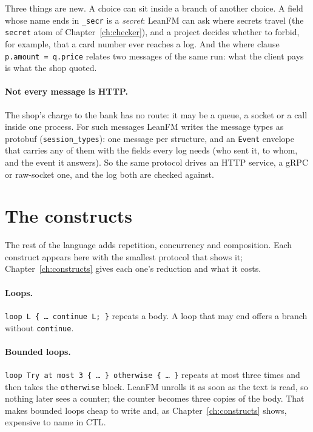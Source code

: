 Three things are new. A choice can sit inside a branch of another choice. A field
whose name ends in \texttt{\_secr} is a \emph{secret}: LeanFM can ask where secrets
travel (the \texttt{secret} atom of Chapter~\ref{ch:checker}), and a project decides
whether to forbid, for example, that a card number ever reaches a log. And the where
clause \texttt{p.amount = q.price} relates two messages of the same run: what the
client pays is what the shop quoted.

\paragraph{Not every message is HTTP.} The shop's charge to the bank has no route:
it may be a queue, a socket or a call inside one process. For such messages LeanFM
writes the message types as protobuf (\texttt{session\_types}): one message per
structure, and an \texttt{Event} envelope that carries any of them with the fields
every log needs (who sent it, to whom, and the event it answers). So the same
protocol drives an HTTP service, a gRPC or raw-socket one, and the log both are
checked against.


\section{The constructs}

The rest of the language adds repetition, concurrency and composition. Each construct
appears here with the smallest protocol that shows it; Chapter~\ref{ch:constructs}
gives each one's reduction and what it costs.

\paragraph{Loops.} \texttt{loop L \{ \ldots\ continue L; \}} repeats a body.
A loop that may end offers a branch without \texttt{continue}.



\paragraph{Bounded loops.} \texttt{loop Try at most 3 \{ \ldots\ \} otherwise \{ \ldots\ \}}
repeats at most three times and then takes the \texttt{otherwise} block. LeanFM unrolls
it as soon as the text is read, so nothing later sees a counter; the counter becomes
three copies of the body. That makes bounded loops cheap to write and, as
Chapter~\ref{ch:constructs} shows, expensive to name in CTL.


